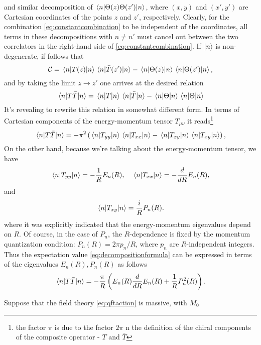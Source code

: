 and similar decomposition of $\mel{n}{\Theta(z)\Theta(z')}{n}$, where $(x,y)$
and $(x',y')$ are Cartesian coordinates of the points $z$ and $z'$,
respectively. Clearly, for the combination \eqref{eq:constantcombination} to be
independent of the coordinates, all terms in these decompositions with $n\neq
n'$ must cancel out between the two correlators in the right-hand side of
\eqref{eq:constantcombination}. If $\ket{n}$ is non-degenerate, if follows that
\begin{equation}
  \mathcal{C} = \mel{n}{T(z)}{n}\mel{n}{\bar{T}(z')}{n}
  - \mel{n}{\Theta(z)}{n}\mel{n}{\Theta(z')}{n},
\end{equation}
and by taking the limit $z\rightarrow z'$ one arrives at the desired relation
\begin{equation}
  \mel{n}{T\bar{T}}{n} = \mel{n}{T}{n}\mel{n}{\bar{T}}{n} - \mel{n}{\Theta}{n}\mel{n}{\Theta}{n}
  \label{eq:decompositionformula}
\end{equation}
It's revealing to rewrite this relation in somewhat different form. In terms
of Cartesian components of the energy-momentum tensor $T_{\mu\nu}$ it
reads\footnote{the factor $\pi$ is due to the factor $2\pi$ n the definition of
the  chiral components of the composite operator - $T$ and $\bar{T}$}
\begin{equation}
  \mel{n}{T\bar{T}}{n} = -\pi^2\left(\mel{n}{T_{yy}}{n}\mel{n}{T_{xx}}{n}
  - \mel{n}{T_{xy}}{n}\mel{n}{T_{xy}}{n}\right),
\end{equation}
On the other hand, because we're talking about the energy-momentum tensor, we
have
\begin{equation}
  \mel{n}{T_{yy}}{n} = -\frac{1}{R}E_n(R), \quad \mel{n}{T_{xx}}{n}
    = - \frac{d}{dR}E_n(R),
\end{equation}
and
\begin{equation}
  \mel{n}{T_{xy}}{n} = \frac{i}{R}P_n(R).
\end{equation}
where it was explicitly indicated that the energy-momentum eigenvalues depend
on $R$. Of course, in the case of $P_n$, the $R$-dependence is fixed by the
momentum quantization condition: $P_n(R) = 2\pi p_n /R$, where $p_n$ are
$R$-independent integers. Thus the expectation value
\eqref{eq:decompositionformula} can be expressed in terms of the eigenvalues
$E_n(R), P_n(R)$ as follows
\begin{equation}
  \mel{n}{T\bar{T}}{n} = -\frac{\pi}{R}\left(E_n(R)\frac{d}{dR}E_n(R)
  + \frac{1}{R}P^2_n(R)\right).
\end{equation}
\par Suppose that the field theory \eqref{eq:qftaction} is massive, with $M_0$
